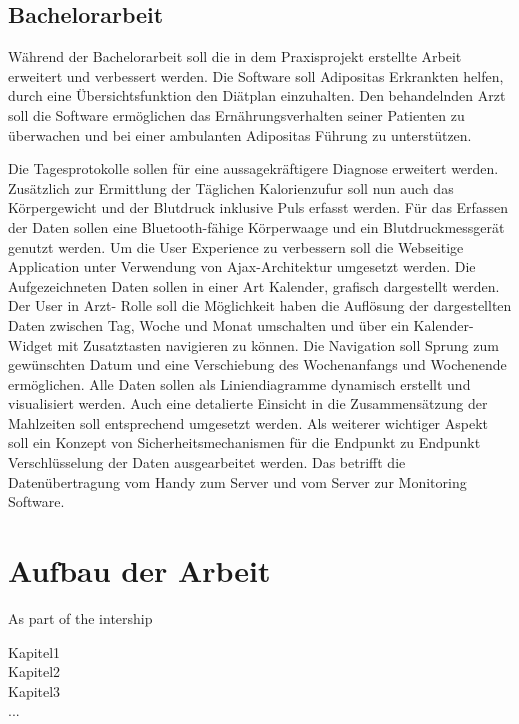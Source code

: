 \subsection*{Bachelorarbeit}

W\"ahrend der Bachelorarbeit soll die in dem Praxisprojekt erstellte Arbeit erweitert und verbessert werden.
Die Software soll Adipositas Erkrankten helfen, durch eine \"Ubersichtsfunktion den Di\"atplan einzuhalten.
Den behandelnden Arzt soll die Software erm\"oglichen das Ern\"ahrungsverhalten seiner Patienten zu \"uberwachen und bei einer ambulanten 
Adipositas F\"uhrung zu unterst\"utzen.

Die Tagesprotokolle sollen f\"ur eine aussagekr\"aftigere Diagnose erweitert werden. 
Zus\"atzlich zur Ermittlung der T\"aglichen Kalorienzufur soll 
nun auch das K\"orpergewicht und der Blutdruck inklusive Puls erfasst werden. 
F\"ur das Erfassen der Daten sollen eine Bluetooth-f\"ahige K\"orperwaage und ein Blutdruckmessger\"at genutzt werden. 
Um die User Experience zu verbessern soll die Webseitige Application unter Verwendung von Ajax-Architektur umgesetzt werden. 
Die Aufgezeichneten Daten sollen in einer Art Kalender, grafisch dargestellt werden. 
Der User in Arzt- Rolle soll die M\"oglichkeit haben die Aufl\"osung der dargestellten Daten zwischen Tag, Woche und Monat umschalten und 
\"uber ein Kalender- Widget mit Zusatztasten navigieren zu k\"onnen. 
Die Navigation soll Sprung zum gew\"unschten Datum und eine Verschiebung des Wochenanfangs und Wochenende erm\"oglichen.
Alle Daten sollen als Liniendiagramme dynamisch erstellt und visualisiert werden. Auch eine detalierte Einsicht in die Zusammens\"atzung der Mahlzeiten
soll entsprechend umgesetzt werden.
Als weiterer wichtiger Aspekt soll ein Konzept von Sicherheitsmechanismen f\"ur die Endpunkt zu Endpunkt Verschl\"usselung der Daten ausgearbeitet werden.
Das betrifft die Daten\"ubertragung vom Handy zum Server und vom Server zur Monitoring Software.
 

\section{Aufbau der Arbeit}

As part of the intership 

Kapitel1 \\

Kapitel2 \\

Kapitel3 \\
...